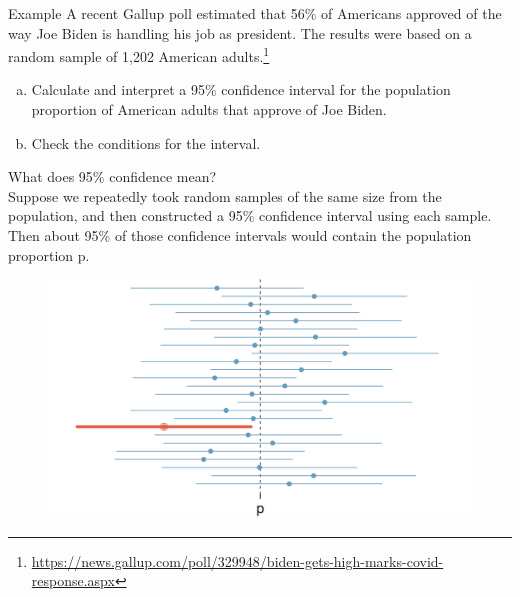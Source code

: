 \documentclass[11pt]{beamer}
\begin{document}
\begin{frame}{Example}
\small
A recent Gallup poll estimated that 56\% of Americans approved of the way Joe Biden is handling his job as president.  The results were based on a random sample of 1,202 American adults.\footnote{\tiny \url{https://news.gallup.com/poll/329948/biden-gets-high-marks-covid-response.aspx}}  
\begin{enumerate}[(a)]
\item Calculate and interpret a 95\% confidence interval for the population proportion of American adults that approve of Joe Biden.  
\vspace{3.5cm}
\item Check the conditions for the interval.
\vspace{1.5cm}
\end{enumerate}
\end{frame}

\begin{frame}
What does 95\% confidence mean?\\
\vspace{10pt}
Suppose we repeatedly took random samples of the same size from the population, and then constructed a 95\% confidence interval using each sample.  Then about 95\% of those confidence intervals would contain the population proportion p.\\

\begin{figure}
\includegraphics[scale=0.2]{figure/CI.png}
\end{figure}
\end{frame}

\end{document}
